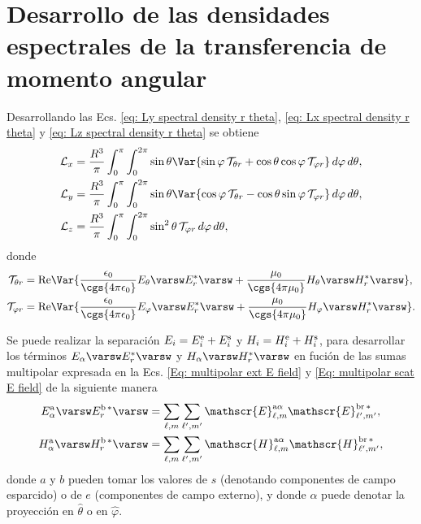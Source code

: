 \section{Desarrollo de las densidades espectrales de la transferencia de momento angular}
Desarrollando las Ecs. \eqref{eq: Ly spectral density r theta}, \eqref{eq: Lx spectral density r theta} y \eqref{eq: Lz spectral density r theta} se obtiene
%
\begin{align}
\mathcal{L}_x &= \frac{R^3}{\pi}\int_0^{\pi}\int_0^{2\pi} \sin\theta \Var{\sin\varphi \,\mathcal{T}_{\theta r} + \cos\theta\cos\varphi\,\mathcal{T}_{\varphi r}} \,d\varphi \, d\theta, \label{eq: Lx spectral integral angles}\\
\mathcal{L}_y &= \frac{R^3}{\pi}\int_0^{\pi}\int_0^{2\pi} \sin\theta \Var{\cos\varphi \,\mathcal{T}_{\theta r} - \cos\theta\sin\varphi\,\mathcal{T}_{\varphi r}} \,d\varphi \, d\theta, \label{eq: Ly spectral integral angles}\\
\mathcal{L}_z &= \frac{R^3}{\pi}\int_0^{\pi}\int_0^{2\pi} \sin^{2}\theta \, \mathcal{T}_{\varphi r} \,d\varphi \, d\theta, \label{eq: Lz spectral integral angles}
\end{align}
% 
donde 
\begin{align}
\mathcal{T}_{\theta r} &= {\rm Re}\Var{\frac{\epsilon_0}{\cgs{4\pi\epsilon_0}} E_{\theta}\varsw E_{r}^{*}\varsw + \frac{\mu_0}{\cgs{4\pi\mu_0}} H_{\theta}\varsw H_{r}^{*}\varsw  },\\
\mathcal{T}_{\varphi r} &= {\rm Re}\Var{\frac{\epsilon_0}{\cgs{4\pi\epsilon_0}} E_{\varphi}\varsw E_{r}^{*}\varsw + \frac{\mu_0}{\cgs{4\pi\mu_0}} H_{\varphi}\varsw H_{r}^{*}\varsw  }.
\end{align}

Se puede realizar la separación $E_i=E_i^{\rm e}+E_i^{\rm s}$ y $H_i=H_i^{\rm e}+H_i^{\rm s}$, para desarrollar los términos $E_{\alpha}\varsw E_{r}^{*}\varsw$ y $H_{\alpha}\varsw H_{r}^{*}\varsw$ en fución de las sumas multipolar expresada en la Ecs. \eqref{Eq: multipolar ext E field} y \eqref{Eq: multipolar scat E field} de la siguiente manera
\begin{align}
E^{\rm a}_{\alpha}\varsw E_{r}^{\rm b \,*}\varsw &= \sum_{\ell, m} \sum_{\ell^{\prime}, m^{\prime}} \mathscr{E}_{\ell, m}^{\text{a}\alpha}\mathscr{E}_{\ell^{\prime}, m^{\prime}}^{\text{br}\,*},\label{eq: cross terms E field}\\
H^{\rm a}_{\alpha}\varsw H_{r}^{\rm b \,*}\varsw &= \sum_{\ell, m} \sum_{\ell^{\prime}, m^{\prime}} \mathscr{H}_{\ell, m}^{\text{a}\alpha}\mathscr{H}_{\ell^{\prime}, m^{\prime}}^{\text{br}\,*},\label{eq: cross terms H field}
\end{align}
donde $a$ y $b$ pueden tomar los valores de $s$ (denotando componentes de campo esparcido) o de $e$ (componentes de campo externo), y donde $\alpha$ puede denotar la proyección en $\hat{ \theta}$ o en $\hat{\varphi}$. 

